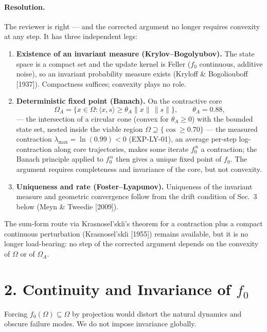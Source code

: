 \documentclass[11pt]{article}
\begin{document}
\paragraph{Resolution.} The reviewer is right --- and the corrected argument
no longer requires convexity at any step. It has three independent legs:
\begin{enumerate}
  \item \textbf{Existence of an invariant measure (Krylov--Bogolyubov).}
        The state space is a compact set and the update kernel is Feller
        ($f_0$ continuous, additive noise), so an invariant probability
        measure exists (Kryloff \& Bogoliouboff [1937]). Compactness
        suffices; convexity plays no role.
  \item \textbf{Deterministic fixed point (Banach).} On the contractive core
        \[
          \Omega_A = \bigl\{x \in \Omega : \langle x, s\rangle \ge
          \theta_A \lVert x\rVert\,\lVert s\rVert\bigr\},
          \qquad \theta_A = 0.88,
        \]
        --- the intersection of a circular cone (convex for $\theta_A \ge 0$)
        with the bounded state set, nested inside the viable region
        $\Omega \supseteq \{\cos \ge 0.70\}$ --- the measured contraction
        $\lambda_{\max} = \ln(0.99) < 0$ (EXP-LY-01), an average per-step
        log-contraction along core trajectories, makes some iterate
        $f_0^{\,n}$ a contraction; the Banach principle applied to
        $f_0^{\,n}$ then gives a unique fixed point of $f_0$. The argument
        requires completeness and invariance of the core, but not convexity.
  \item \textbf{Uniqueness and rate (Foster--Lyapunov).} Uniqueness of the
        invariant measure and geometric convergence follow from the drift
        condition of Sec.~3 below (Meyn \& Tweedie [2009]).
\end{enumerate}
The sum-form route via Krasnosel'ski\u{\i}'s theorem for a contraction plus a
compact continuous perturbation (Krasnosel'ski\u{\i} [1955]) remains
available, but it is no longer load-bearing: no step of the corrected
argument depends on the convexity of $\Omega$ or of $\Omega_A$.

\section*{2. Continuity and Invariance of $f_0$}

Forcing $f_0(\Omega) \subseteq \Omega$ by projection would distort the natural
dynamics and obscure failure modes. We do not impose invariance globally.
\end{document}
